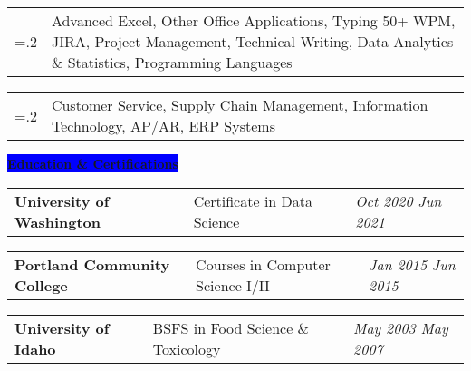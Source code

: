 \documentclass[letterpaper,12pt]{article}[leftmargin=*]
\makeatletter
\newcommand{\projects}[2]{\vspace{4pt}
  \colorbox{Neutral}{\color{white}#1\hspace{9pt}\raggedbottom\normalsize\textbf{#2\hspace{4pt}}}
}
\newcommand{\education}[2]{\vspace{4pt}
  \colorbox{Blue}{\color{white}#1\hspace{9pt}\raggedbottom\normalsize\textbf{#2\hspace{4pt}}}
}
\newcommand{\resumeSectionStart}{\begin{itemize}[leftmargin=0.1in]}
\newcommand{\resumeSectionEnd}{\end{itemize}}
\newcommand{\repo}[2]{\href{#1}{\underline{#2}}}
\newcommand{\resumeProject}[3]{
  \vspace{-6pt}\item[]
    \begin{tabularx}{0.97\textwidth}{X@{\hspace{60pt}} r}
      \textbf{\color{primary}#1} & {\color{accent}\small#2} \\
    \end{tabularx}
    {#3}
}
\newcommand{\resumeSkill}[2]{
  \vspace{-6pt}
  \item[]
    \begin{tabularx}{0.97\textwidth}{>{\hsize=.2\hsize}X X }
      {\textbf{#1}} & {\small#2} \\
    \end{tabularx}
}
\newcommand{\resumeEducation}[3]{
  \vspace{-6pt}
  \item[]
    \begin{tabularx}{0.97\textwidth}[t]{>{\raggedright}X >{\raggedright\arraybackslash}X >{\raggedleft\arraybackslash}X}
      \textbf{\color{primary}#1} & {\small#2} & \textit{\color{accent}\small#3} \\
    \end{tabularx}
}
\newcommand{\tag}[1]{%
  \tikzmarknode[fill=white,fill opacity=0,draw=subtle!60!subtle,thick,rounded corners,inner sep=0.4ex,text height=1.5ex,text depth=.25ex, text opacity=1]{test}{\hspace{1pt}\small{#1}\hspace{1pt}}
}
\makeatother
\begin{document}
\resumeSectionStart{
  \resumeSkill{Proficient in}{Advanced Excel, Other Office Applications, Typing 50+ WPM, JIRA, Project Management, Technical Writing, Data Analytics \& Statistics, Programming Languages}
  \resumeSkill{Familiar with}{Customer Service, Supply Chain Management, Information Technology, AP/AR, ERP Systems}
}
\resumeSectionEnd{}

\education{\faGraduationCap}{Education \& Certifications}

\resumeSectionStart{
  \resumeEducation{University of Washington}{Certificate in Data Science}{Oct 2020 \textemdash{} Jun 2021}
  \resumeEducation{Portland Community College}{Courses in Computer Science I/II}{Jan 2015 \textemdash{} Jun 2015}
  \resumeEducation{University of Idaho}{BSFS in Food Science \& Toxicology}{May 2003 \textemdash{} May 2007}
}
\resumeSectionEnd{}




\end{document}
